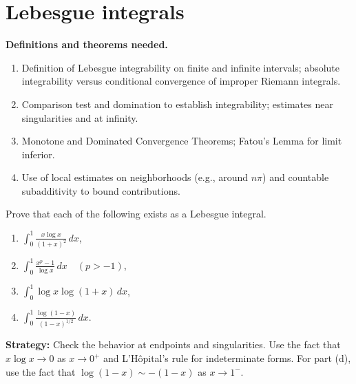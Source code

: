 \section{Lebesgue integrals}

\noindent\textbf{Definitions and theorems needed.}
\begin{enumerate}[label=(\alph*)]
\item Definition of Lebesgue integrability on finite and infinite intervals; absolute integrability versus conditional convergence of improper Riemann integrals.
\item Comparison test and domination to establish integrability; estimates near singularities and at infinity.
\item Monotone and Dominated Convergence Theorems; Fatou's Lemma for limit inferior.
\item Use of local estimates on neighborhoods (e.g., around $n\pi$) and countable subadditivity to bound contributions.
\end{enumerate}



\begin{problembox}
\begin{problemstatement}
Prove that each of the following exists as a Lebesgue integral.
\begin{enumerate}[label=(\alph*)]
\item $\int_{0}^{1} \frac{x \log x}{(1 + x)^2} \, dx$,
\item $\int_{0}^{1} \frac{x^p - 1}{\log x} \, dx \quad (p > -1)$,
\item $\int_{0}^{1} \log x \log (1 + x) \, dx$,
\item $\int_{0}^{1} \frac{\log (1 - x)}{(1 - x)^{1/2}} \, dx.$
\end{enumerate}
\end{problemstatement}
\end{problembox}

\noindent\textbf{Strategy:} Check the behavior at endpoints and singularities. Use the fact that $x \log x \to 0$ as $x \to 0^+$ and L'Hôpital's rule for indeterminate forms. For part (d), use the fact that $\log(1-x) \sim -(1-x)$ as $x \to 1^-$.

